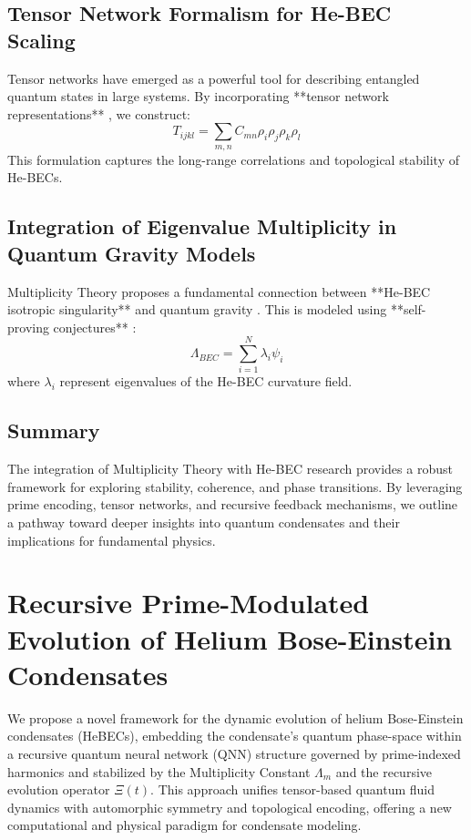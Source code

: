\documentclass{article}
\theoremstyle{plain}
\begin{document}
\subsection{Tensor Network Formalism for He-BEC Scaling}
Tensor networks have emerged as a powerful tool for describing entangled quantum states in large systems. By incorporating **tensor network representations** \cite{hybrid_quantum_supremacy}, we construct:
\begin{equation}
    T_{ijkl} = \sum_{m,n} C_{mn} \rho_i \rho_j \rho_k \rho_l
\end{equation}
This formulation captures the long-range correlations and topological stability of He-BECs.

\subsection{Integration of Eigenvalue Multiplicity in Quantum Gravity Models}
Multiplicity Theory proposes a fundamental connection between **He-BEC isotropic singularity** and quantum gravity \cite{astrophysics}. This is modeled using **self-proving conjectures** \cite{self_proving_conjectures}:
\begin{equation}
    \Lambda_{BEC} = \sum_{i=1}^{N} \lambda_i \psi_i
\end{equation}
where $\lambda_i$ represent eigenvalues of the He-BEC curvature field.

\subsection{Summary}
The integration of Multiplicity Theory with He-BEC research provides a robust framework for exploring stability, coherence, and phase transitions. By leveraging prime encoding, tensor networks, and recursive feedback mechanisms, we outline a pathway toward deeper insights into quantum condensates and their implications for fundamental physics.
\section{Recursive Prime-Modulated Evolution of Helium Bose-Einstein Condensates}

We propose a novel framework for the dynamic evolution of helium Bose-Einstein condensates (HeBECs), embedding the condensate's quantum phase-space within a recursive quantum neural network (QNN) structure governed by prime-indexed harmonics and stabilized by the Multiplicity Constant $\Lambda_m$ and the recursive evolution operator $\Xi(t)$. This approach unifies tensor-based quantum fluid dynamics with automorphic symmetry and topological encoding, offering a new computational and physical paradigm for condensate modeling.
\end{document}
